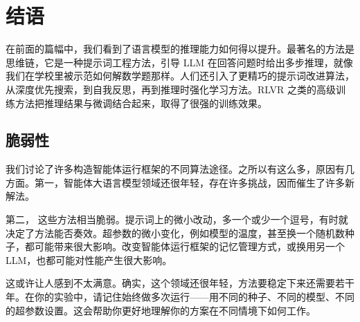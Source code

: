 \section{结语}
在前面的篇幅中，我们看到了语言模型的推理能力如何得以提升。最著名的方法是思维链，它是一种提示词工程方法，引导 LLM 在回答问题时给出多步推理，就像我们在学校里被示范如何解数学题那样。人们还引入了更精巧的提示词改进算法，从深度优先搜索，到自我反思，再到推理时强化学习方法。RLVR 之类的高级训练方法把推理结果与微调结合起来，取得了很强的训练效果。

\subsection{脆弱性}%
我们讨论了许多构造智能体运行框架的不同算法途径。之所以有这么多，原因有几方面。第一，智能体大语言模型领域还很年轻，存在许多挑战，因而催生了许多新解法。

第二，%
这些方法相当脆弱。提示词上的微小改动，多一个或少一个逗号，有时就决定了方法能否奏效。超参数的微小变化，例如模型的温度，甚至换一个随机数种子，都可能带来很大影响。改变智能体运行框架的记忆管理方式，或换用另一个 LLM，也都可能对性能产生很大影响。

这或许让人感到不太满意。确实，这个领域还很年轻，方法要稳定下来还需要若干年。在你的实验中，请记住始终做多次运行——用不同的种子、不同的模型、不同的超参数设置。这会帮助你更好地理解你的方案在不同情境下如何工作。


